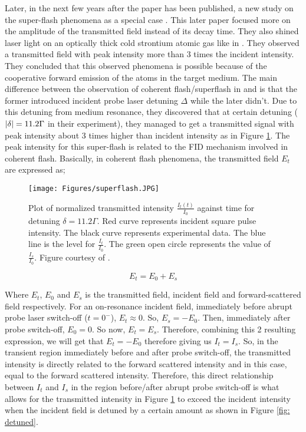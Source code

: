 Later, in the next few years after the paper \cite{Chalony2011} has been published, a new study on the super-flash phenomena as a special case \cite{Kwong2014}. This later paper focused more on the amplitude of the transmitted field instead of its decay time. They also shined laser light on an optically thick cold strontium atomic gas like in \cite{Chalony2011}. They observed a transmitted field with peak intensity more than 3 times the incident intensity. They concluded that this observed phenomena is possible because of the cooperative forward emission of the atoms in the target medium. The main difference between the observation of coherent flash/superflash in \cite{Kwong2014} and \cite{Chalony2011} is that the former introduced incident probe laser detuning $\Delta$ while the later didn't. Due to this detuning from medium resonance, they discovered that at certain detuning ($\abs{\delta} = 11.2 \Gamma$ in their experiment), they managed to get a transmitted signal with peak intensity about 3 times higher than incident intensity as in Figure \ref{fig: superflash}. The peak intensity for this super-flash is related to the FID mechanism involved in coherent flash. Basically, in coherent flash phenomena, the transmitted field $E_{t}$ are expressed as;

\begin{figure}
    \centering
    \texttt{[image: Figures/superflash.JPG]}
    \caption{Plot of normalized transmitted intensity $\frac{I_{t}(t)}{I_{0}}$ against time for detuning $\delta = 11.2\Gamma$. Red curve represents incident square pulse intensity. The black curve represents experimental data. The blue line is the level for $\frac{I_t}{I_0}$. The green open circle represents the value of $\frac{I_{s}}{I_{0}}$. Figure courtesy of \protect\cite{Kwong2014}.}
    \label{fig: superflash}
\end{figure}

\begin{equation}
    E_{t} = E_{0} + E_{s}
\end{equation}

Where $E_{t}$, $E_{0}$ and $E_{s}$ is the transmitted field, incident field and forward-scattered field respectively. For an on-resonance incident field, immediately before abrupt probe laser switch-off ($t = 0^{-}$), $E_{t} \approx 0$. So, $E_{s} = - E_{0}$. Then, immediately after probe switch-off, $E_{0} = 0$. So now, $E_{t} = E_{s}$. Therefore, combining this 2 resulting expression, we will get that $E_{t} = - E_{0}$ therefore giving us $I_{t} = I_{s}$. So, in the transient region immediately before and after probe switch-off, the transmitted intensity is directly related to the forward scattered intensity and in this case, equal to the forward scattered intensity. Therefore, this direct relationship between $I_{t}$ and $I_{s}$ in the region before/after abrupt probe switch-off is what allows for the transmitted intensity in Figure \ref{fig: superflash} to exceed the incident intensity when the incident field is detuned by a certain amount as shown in Figure \ref{fig: detuned}.

